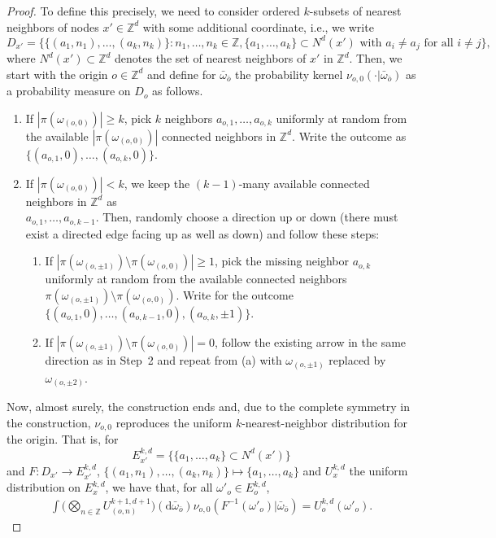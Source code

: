 \documentclass[oneside]{amsart}
\theoremstyle{definition}
\newcommand{\1}{\mathbbm{1}}
\newcommand{\0}{\mathbf{o}}
\renewcommand{\d}{\mathrm{d}}
\newcommand{\Z}{\mathbb{Z}}
\numberwithin{equation}{section}
\begin{document}
\begin{proof}
To define this precisely, we need to consider ordered $k$-subsets of nearest neighbors of nodes $x'\in \Z^d$ with some additional coordinate, i.e., we write 
$$D_{x'}=\{\{(a_{1},n_1),\dots,(a_{k},n_k)\}\colon n_1,\dots,n_k\in \Z, \{a_1,\dots,a_k\}\subset N^d(x')\text{ with }a_i\neq a_j\text{ for all }i\neq j\},$$
where $N^d(x')\subset\Z^d$ denotes the set of nearest neighbors of $x'$ in $\Z^d$.
Then, we start with the origin $o\in \Z^d$ and define for $\bar\omega_{\bar o}$ the probability kernel $\nu_{o,0}(\cdot|\bar\omega_{\bar o})$ as a probability measure on $D_o$ as follows. 
\begin{enumerate}
\item[\bf Step 1] If $|\pi(\omega_{(o,0)})|\ge k$, pick $k$ neighbors $a_{o,1},\dots,a_{o,k}$ uniformly at random from the available $|\pi(\omega_{(o,0)})|$ connected neighbors in $\Z^d$. Write the outcome as $\big\{(a_{o,1},0),\dots,(a_{o,k},0)\big\}$.
\item[\bf Step 2] If $|\pi(\omega_{(o,0)})|<k$, we keep the $(k-1)$-many available connected neighbors in $\Z^d$ as \\ $a_{o,1},\dots, a_{o,k-1}$. Then, randomly choose a direction up or down (there must exist a directed edge facing up as well as down) and follow these steps:
\begin{enumerate}
\item If $|\pi(\omega_{(o,\pm 1)})\setminus \pi(\omega_{(o,0)})|\ge 1$, 
pick the missing neighbor $a_{o,k}$ uniformly at random from the available connected neighbors $\pi(\omega_{(o,\pm 1)})\setminus \pi(\omega_{(o,0)})$. Write for the outcome $\big\{(a_{o,1},0),\dots,(a_{o,k-1},0),(a_{o,k},\pm 1)\big\}$.
\item If $|\pi(\omega_{(o,\pm 1)})\setminus \pi(\omega_{(o,0)})|= 0$, follow the existing arrow in the same direction as in Step~2 and repeat from (a) with $\omega_{(o,\pm 1)}$ replaced by $\omega_{(o,\pm 2)}$.
\end{enumerate}
\end{enumerate}
Now, almost surely, the construction ends and, due to the complete symmetry in the construction, $\nu_{o,0}$ reproduces the uniform $k$-nearest-neighbor distribution for the origin. That is, for 
$$E^{k,d}_{x'}=\{\{a_1,\dots, a_k\}\subset N^d(x')\}$$ 
and $F\colon D_{x'}\to E^{k,d}_{x'}$, $\big\{(a_1,n_1),\dots,(a_k,n_k)\big\}\mapsto \{a_1,\dots, a_k\}$ and $U^{k,d}_x$ the uniform distribution on $E^{k,d}_x$, we have that, for all $\omega'_o\in E^{k,d}_o$,
\begin{align*}
\int \Big(\bigotimes_{n\in \Z}U^{k+1,d+1}_{(o,n)}\Big)(\d \bar \omega_{\bar o})\nu_{o,0}(F^{-1}(\omega'_o)|\bar\omega_{\bar o})=U^{k,d}_o(\omega'_o).
\end{align*}


\end{proof}
\end{document}
